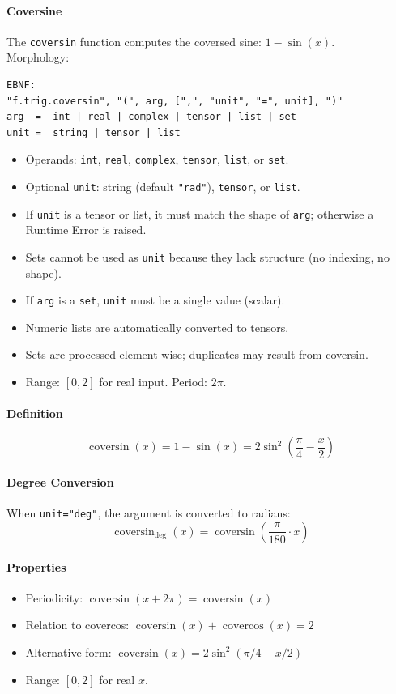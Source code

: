 \paragraph{Coversine}
The \texttt{coversin} function computes the coversed sine: $1 - \sin(x)$.\\
Morphology:
\begin{verbatim}
EBNF:
"f.trig.coversin", "(", arg, [",", "unit", "=", unit], ")"
arg  =  int | real | complex | tensor | list | set
unit =  string | tensor | list
\end{verbatim}
\begin{itemize}
\item Operands: \texttt{int}, \texttt{real}, \texttt{complex}, \texttt{tensor}, \texttt{list}, or \texttt{set}.
\item Optional \texttt{unit}: string (default \texttt{"rad"}), \texttt{tensor}, or \texttt{list}.
\item If \texttt{unit} is a tensor or list, it must match the shape of \texttt{arg}; otherwise a Runtime Error is raised.
\item Sets cannot be used as \texttt{unit} because they lack structure (no indexing, no shape).
\item If \texttt{arg} is a \texttt{set}, \texttt{unit} must be a single value (scalar).
\item Numeric lists are automatically converted to tensors.
\item Sets are processed element-wise; duplicates may result from coversin.
\item Range: $[0, 2]$ for real input. Period: $2\pi$.
\end{itemize}

\paragraph{Definition}
\[
\operatorname{coversin}(x) = 1 - \sin(x) = 2\sin^2\left(\frac{\pi}{4} - \frac{x}{2}\right)
\]

\paragraph{Degree Conversion}
When \texttt{unit="deg"}, the argument is converted to radians:
\[
\operatorname{coversin}_{\text{deg}}(x) = \operatorname{coversin}\left(\frac{\pi}{180} \cdot x\right)
\]

\paragraph{Properties}
\begin{itemize}
\item Periodicity: $\operatorname{coversin}(x + 2\pi) = \operatorname{coversin}(x)$
\item Relation to covercos: $\operatorname{coversin}(x) + \operatorname{covercos}(x) = 2$
\item Alternative form: $\operatorname{coversin}(x) = 2\sin^2(\pi/4 - x/2)$
\item Range: $[0, 2]$ for real $x$.
\end{itemize}


